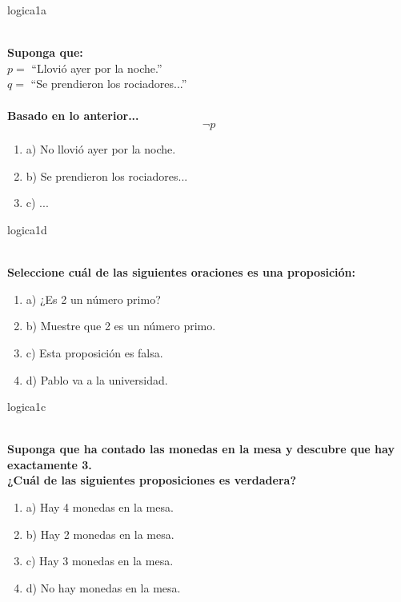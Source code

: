 \documentclass{article}
\begin{document}
\begin{question}{1}{logica}{1}{a}{
\\\textbf{Suponga que:}\\
\(p =\) “Llovió ayer por la noche.”\\
\(q =\) “Se prendieron los rociadores...”\\
\\[1mm]
\textbf{Basado en lo anterior...}\\
$$\neg p$$

\begin{enumerate}
    \item a) No llovió ayer por la noche.
    \item b) Se prendieron los rociadores...
    \item c) ...
\end{enumerate}
}
\end{question}

\begin{question}{2}{logica}{1}{d}{%
\\\textbf{Seleccione cuál de las siguientes oraciones \textbf{es} una proposición:}\\
\begin{enumerate}
    \item a) ¿Es 2 un número primo?
    \item b) Muestre que 2 es un número primo.
    \item c) Esta proposición es falsa.
    \item d) Pablo va a la universidad.
\end{enumerate}
}
\end{question}

\begin{question}{3}{logica}{1}{c}{%
\\\textbf{Suponga que ha contado las monedas en la mesa y descubre que hay exactamente 3.}\\
\textbf{¿Cuál de las siguientes proposiciones es \textbf{verdadera}?}\\

\begin{enumerate}
    \item a) Hay 4 monedas en la mesa.
    \item b) Hay 2 monedas en la mesa.
    \item c) Hay 3 monedas en la mesa.
    \item d) No hay monedas en la mesa.
\end{enumerate}
}
\end{question}
\end{document}
